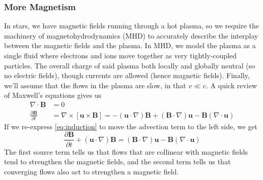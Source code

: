 \documentclass[10pt]{article}
\numberwithin{equation}{section}
\begin{document}
  \subsubsection{More Magnetism} %
  \label{ssub:more_magnetism}
    In stars, we have magnetic fields running through a hot plasma, so we
    require the machinery of magnetohydrodynamics (MHD) to accurately describe
    the interplay between the magnetic fields and the plasma. In MHD, we model
    the plasma as a single fluid where electrons and ions move together as very
    tightly-coupled particles. The overall charge of said plasma both locally
    and globally neutral (so no electric fields), though currents are allowed
    (hence magnetic fields). Finally, we'll assume that the flows in the plasma
    are slow, in that $v\ll c$. A quick review of Maxwell's equations gives us
    \begin{align}
      \label{eq:monopole}\nabla\cdot \mathbf{B} &= 0\\
      \label{eq:induction}\frac{\partial \mathbf{B}}{\partial t} &= \nabla
      \times \left[\mathbf{u} \times \mathbf{B}\right] = -(\mathbf{u} \cdot
      \nabla)\mathbf{B} + (\mathbf{B}\cdot \nabla)\mathbf{u} -
      \mathbf{B}(\nabla\cdot \mathbf{u})
    \end{align}
    If we re-express \eqref{eq:induction} to move the advection term to the
    left side, we get
    \begin{equation}
      \label{eq:induction2} \frac{\partial\mathbf{B}}{\partial t} +
      (\mathbf{u}\cdot\nabla)\mathbf{B} = (\mathbf{B}\cdot\nabla)\mathbf{u} -
      \mathbf{B}(\nabla\cdot \mathbf{u})
    \end{equation}
    The first source term tells us that flows that are collinear with magnetic
    fields tend to strengthen the magnetic fields, and the second term tells us
    that converging flows also act to strengthen a magnetic field.\\
    
\end{document}
